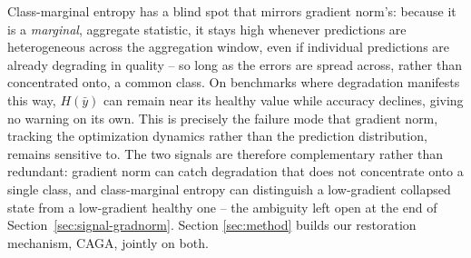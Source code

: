Class-marginal entropy has a blind spot that mirrors gradient norm's: because
it is a \emph{marginal}, aggregate statistic, it stays high whenever
predictions are heterogeneous across the aggregation window, even if
individual predictions are already degrading in quality -- so long as the
errors are spread across, rather than concentrated onto, a common class. On
benchmarks where degradation manifests this way, $H(\bar y)$ can remain near
its healthy value while accuracy declines, giving no warning on its own.
This is precisely the failure mode that gradient norm, tracking the
optimization dynamics rather than the prediction distribution, remains
sensitive to. The two signals are therefore complementary rather than
redundant: gradient norm can catch degradation that does not concentrate
onto a single class, and class-marginal entropy can distinguish a
low-gradient collapsed state from a low-gradient healthy one -- the
ambiguity left open at the end of Section~\ref{sec:signal-gradnorm}. Section
\ref{sec:method} builds our restoration mechanism, CAGA, jointly on both.
